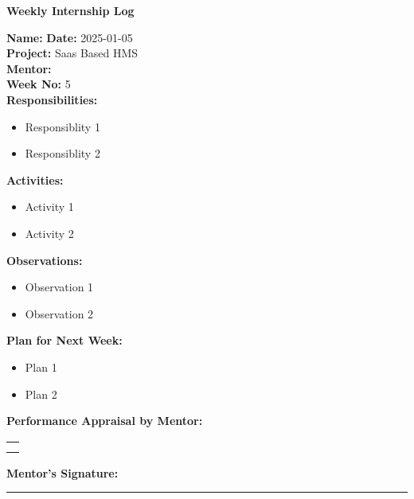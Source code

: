 \begin{center}
  \bfseries Weekly Internship Log
\end{center}

\noindent
\textbf{Name:}  \hfill \textbf{Date:} 2025-01-05 \\
\textbf{Project:} Saas Based HMS \hfill \\
\textbf{Mentor:}   \\
\textbf{Week No:} 5 \\

\noindent
\textbf{Responsibilities:}
\begin{itemize}
    \item Responsiblity 1
    \item Responsiblity 2
\end{itemize}

\noindent
\textbf{Activities:}
\begin{itemize}
    \item Activity 1
    \item Activity 2
\end{itemize}

\noindent
\textbf{Observations:}
\begin{itemize}
    \item Observation 1
    \item Observation 2
\end{itemize}

\noindent
\textbf{Plan for Next Week:}
\begin{itemize}
    \item  Plan 1
    \item Plan 2
\end{itemize}

\noindent
\textbf{Performance Appraisal by Mentor:} \\
\begin{table}[h]
    \centering
    \noindent
    \begin{tabularx}{\textwidth} { 
        | >{\centering\arraybackslash}X| }

        \hline
          \\ \\       	                    
        \hline
    \end{tabularx}
\end{table}


\vspace{2em}
\noindent
\textbf{Mentor’s Signature:} \\
\rule{0.4\textwidth}{0.5pt}
